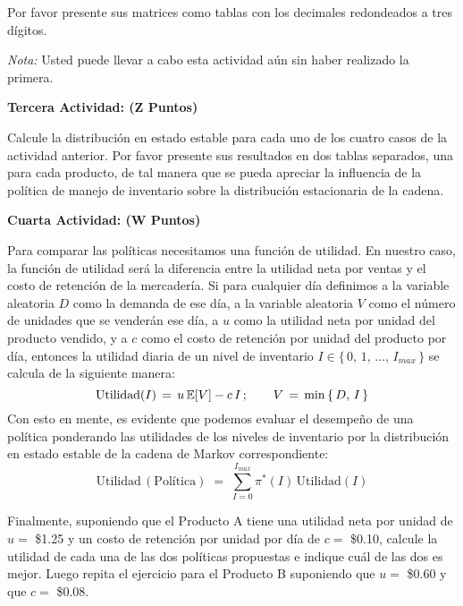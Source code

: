 \documentclass[ a4paper, twoside, 11pt]{article}
\begin{document}
\begin{problem}
Por favor presente sus matrices como tablas con los decimales redondeados a tres d\'igitos.

\emph{Nota:} Usted puede llevar a cabo esta actividad a\'un sin haber realizado la primera. 

\textbf{Tercera Actividad: (Z Puntos)}

Calcule la distribuci\'on en estado estable para cada uno de los cuatro casos de la actividad anterior. Por favor presente sus resultados en dos tablas separados, una para cada producto, de tal manera que se pueda apreciar la influencia de la pol\'itica de manejo de inventario sobre la distribuci\'on estacionaria de la cadena. 

\textbf{Cuarta Actividad: (W Puntos)}

Para comparar las pol\'iticas necesitamos una funci\'on de utilidad. En nuestro caso, la funci\'on de utilidad ser\'a la diferencia entre la utilidad neta por ventas y el costo de retenci\'on de la mercader\'ia. Si para cualquier d\'ia definimos a la variable aleatoria $D$ como la demanda de ese d\'ia, \linebreak a la variable aleatoria $V$ como el n\'umero de unidades que se vender\'an ese d\'ia, a $u$ como la utilidad neta por unidad del producto vendido, y a $c$ como el costo de retenci\'on por unidad del producto por d\'ia, entonces la utilidad diaria de un nivel de inventario $I \in \{ \, 0, \, 1, \, \dots, \, I_{max} \, \}$ se calcula de la siguiente manera: 
\[
\text{Utilidad}(I) \, = \, 
u \, \mathbb{E}[ V ] - c \, I \, ; \qquad
V \, = \, \min \, \{ \, D, \, I \, \}
\]
Con esto en mente, es evidente que podemos evaluar el desempe\~no de una pol\'itica ponderando las utilidades de los niveles de inventario por la distribuci\'on en estado estable de la cadena de Markov correspondiente:
\[
\text{Utilidad} \, (\text{Pol\'itica}) \; = \; 
\sum_{ I = 0 }^{I_{max}} \pi^*(I) \, \text{Utilidad}(I)
\]

Finalmente, suponiendo que el Producto A tiene una utilidad neta por unidad de $u =$ \$1.25 y un costo de retenci\'on por unidad por d\'ia de $c =$ \$0.10, calcule la utilidad de cada una de las dos pol\'iticas propuestas e indique cu\'al de las dos es mejor. Luego repita el ejercicio para el Producto B suponiendo que $u =$ \$0.60 y que $c =$ \$0.08. 

\end{problem}
\vspace{\baselineskip}
\end{document}
